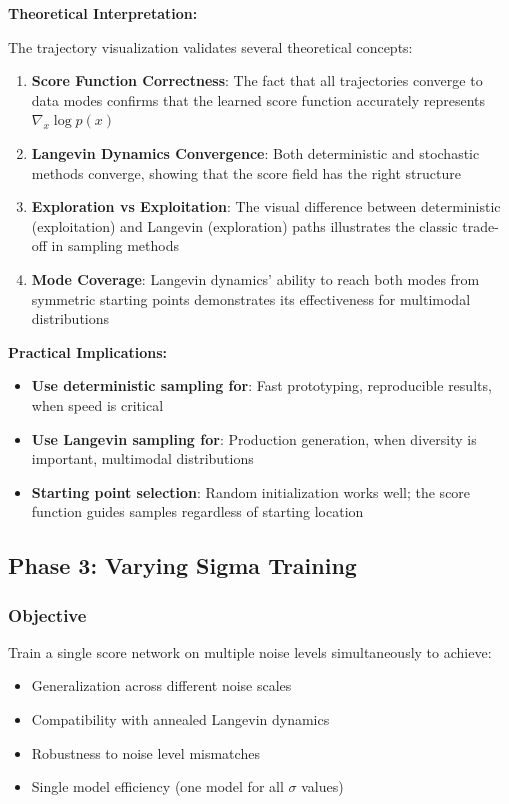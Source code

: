 \documentclass[12pt,a4paper]{article}
\begin{document}
\textbf{Theoretical Interpretation:}

The trajectory visualization validates several theoretical concepts:

\begin{enumerate}
    \item \textbf{Score Function Correctness}: The fact that all trajectories converge to data modes confirms that the learned score function accurately represents $\nabla_x \log p(x)$
    
    \item \textbf{Langevin Dynamics Convergence}: Both deterministic and stochastic methods converge, showing that the score field has the right structure
    
    \item \textbf{Exploration vs Exploitation}: The visual difference between deterministic (exploitation) and Langevin (exploration) paths illustrates the classic trade-off in sampling methods
    
    \item \textbf{Mode Coverage}: Langevin dynamics' ability to reach both modes from symmetric starting points demonstrates its effectiveness for multimodal distributions
\end{enumerate}

\textbf{Practical Implications:}

\begin{itemize}
    \item \textbf{Use deterministic sampling for}: Fast prototyping, reproducible results, when speed is critical
    \item \textbf{Use Langevin sampling for}: Production generation, when diversity is important, multimodal distributions
    \item \textbf{Starting point selection}: Random initialization works well; the score function guides samples regardless of starting location
\end{itemize}

\subsection{Phase 3: Varying Sigma Training}

\subsubsection{Objective}

Train a single score network on multiple noise levels simultaneously to achieve:
\begin{itemize}
    \item Generalization across different noise scales
    \item Compatibility with annealed Langevin dynamics
    \item Robustness to noise level mismatches
    \item Single model efficiency (one model for all $\sigma$ values)
\end{itemize}
\end{document}
